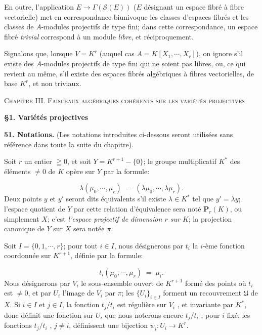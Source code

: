 
En outre, l'application $E \to \Gamma(\mathcal{S}(E))$ ($E$ désignant un espace fibré à fibre vectorielle) met en correspondance biunivoque les classes d'espaces fibrés et les classes de $A$-modules projectifs de type fini; dans cette correspondance, un espace fibré \textit{trivial} correspond à un module \textit{libre}, et réciproquement.

Signalons que, lorsque $V = K^r$ (auquel cas $A = K[X_1 , \cdots , X_r]$), on ignore s'il existe des $A$-modules projectifs de type fini qui ne soient pas libres, ou, ce qui revient au même, s'il existe des espaces fibrés algébriques à fibres vectorielles, de base $K^r$, et non triviaux.


\textsc{Chapitre III. Faisceaux algébriques cohérents sur les variétés projectives}


\textbf{§1. Variétés projectives}

\textbf{51. Notations.} (Les notations introduites ci-dessous seront utilisées sans référence dans toute la suite du chapitre).

Soit $r$ un entier $\geqq 0$, et soit $Y = K^{r+1} - \{0\}$; le groupe multiplicatif $K^*$ des éléments $\neq 0$ de $K$ opère sur $Y$ par la formule:

\begin{equation*}
\lambda(\mu_0 , \cdots , \mu_r) \;=\; (\lambda\mu_0 , \cdots , \lambda\mu_r).
\end{equation*}
Deux points $y$ et $y'$ seront dits équivalents s'il existe $\lambda \in K^*$ tel que $y' = \lambda y$; l'espace quotient de $Y$ par cette relation d'équivalence sera noté $\mathbf{P}_r(K)$, ou simplement $X$; c'est \textit{l'espacc projectif de dimension $r$ sur $K$}; la projection canonique de $Y$ sur $X$ sera notée $\pi$.

Soit $I = \{0, 1, \cdots , r\}$; pour tout $i \in I$, nous désignerons par $t_i$ la $i$-ème fonction coordonnée sur $K^{r+1}$, définie par la formule:

\begin{equation*}
t_i(\mu_0 , \cdots , \mu_r) \;=\; \mu_i .
\end{equation*}
Nous désignerons par $V_i$ le sous-ensemble ouvert de $K^{r+1}$ formé des points où $t_i$ est $\neq 0$, et par $U_i$ l'image de $V_i$ par $\pi$; les $\{U_i\}_{i \in I}$ forment un recouvrement $\mathfrak{U}$ de $X$. Si $i \in I$ et $j \in I$, la fonction $t_j/t_i$ est régulière sur $V_i$ , et invariante par $K^*$, donc définit une fonction sur $U_i$ que nous noterons encore $t_j/t_i$ ; pour $i$ fixé, les fonctions $t_j/t_i$ , $j \neq i$, définissent une bijection $\psi_i : U_i \to K^r$.


